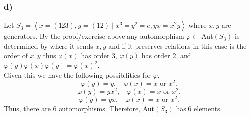\documentclass[12pt, letterpaper]{article}
\theoremstyle{definition}
\newcommand{\ang}[1]{\left\langle #1 \right\rangle}
\begin{document}
\subsubsection*{d)}
Let $S_3=\ang{x=(123),y=(12) \mid x^3=y^2=e, yx=x^2y}$ where $x,y$ are generators. By the proof/exercise above any automorphism $\varphi \in $ Aut$(S_3)$ is determined by where it sends $x,y$ 
and if it preserves relations in this case is the order of $x,y$ thus $\varphi(x)$ has order 3, $\varphi(y)$ has order 2, and $\varphi(y)\varphi(x)\varphi(y)=\varphi(x)^2$.\\
Given this we have the following possibilities for $\varphi$,\\
\[
\varphi(y)=y, \quad \varphi(x)=x \text{ or } x^2.
\]
\[
\varphi(y)=yx^2, \quad \varphi(x)=x \text{ or } x^2.
\]
\[
\varphi(y)=yx, \quad \varphi(x)=x \text{ or } x^2.
\]
Thus, there are $6$ automorphisms.
Therefore, Aut$(S_3)$ has 6 elements.
\end{document}
